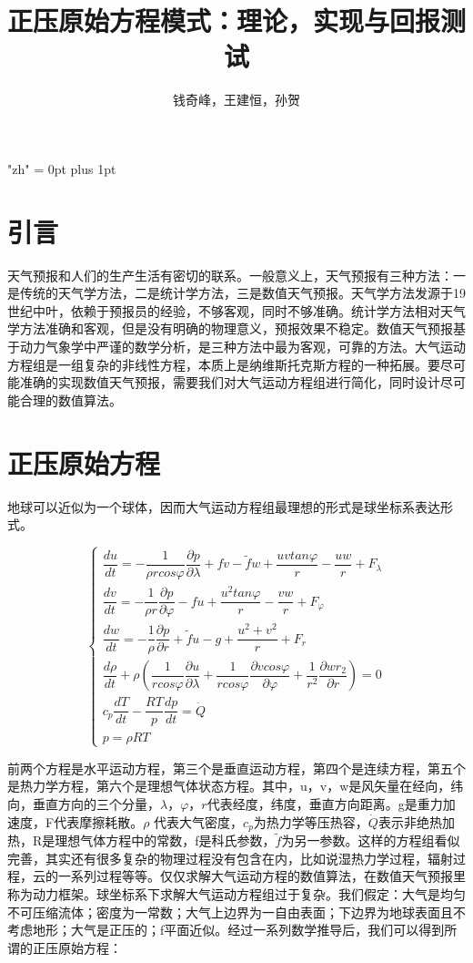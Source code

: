 \documentclass[a4paper,12pt]{article}
\title{正压原始方程模式：理论，实现与回报测试}
\date{}
\author{钱奇峰，王建恒，孙贺}
\begin{document}
\maketitle
\XeTeXlinebreaklocale "zh"
\XeTeXlinebreakskip = 0pt plus 1pt

\section{引言}
\indent
天气预报和人们的生产生活有密切的联系。一般意义上，天气预报有三种方法：一是传统的天气学方法，二是统计学方法，三是数值天气预报。天气学方法发源于19世纪中叶，依赖于预报员的经验，不够客观，同时不够准确。统计学方法相对天气学方法准确和客观，但是没有明确的物理意义，预报效果不稳定。数值天气预报基于动力气象学中严谨的数学分析，是三种方法中最为客观，可靠的方法。大气运动方程组是一组复杂的非线性方程，本质上是纳维斯托克斯方程的一种拓展。要尽可能准确的实现数值天气预报，需要我们对大气运动方程组进行简化，同时设计尽可能合理的数值算法。

\section{正压原始方程}
地球可以近似为一个球体，因而大气运动方程组最理想的形式是球坐标系表达形式。

\begin{equation}
\begin{cases}
\dfrac{du}{dt}=-\dfrac{1}{\rho r cos\varphi}\dfrac{\partial{p}}{\partial{\lambda}}+fv-\tilde{f}w+\dfrac{uvtan\varphi}{r}-\dfrac{uw}{r}+F_{\lambda}\\
\dfrac{dv}{dt}=-\dfrac{1}{\rho r }\dfrac{\partial{p}}{\partial{\varphi}}-fu+\dfrac{u^2tan\varphi}{r}-\dfrac{vw}{r}+F_{\varphi}\\
\dfrac{dw}{dt}=-\dfrac{1}{\rho}\dfrac{\partial{p}}{\partial{r}}+\tilde{f}u-g+\dfrac{u^2+v^2}{r}+F_r\\
\dfrac{d\rho}{dt}+\rho(\dfrac{1}{rcos\varphi}\dfrac{\partial{u}}{\partial{\lambda}} + \dfrac{1}{rcos\varphi}\dfrac{\partial{vcos\varphi}}{\partial{\varphi}} + \dfrac{1}{r^2}\dfrac{\partial{wr_2}}{\partial{r}})=0\\
c_p\dfrac{dT}{dt}-\dfrac{RT}{p}\dfrac{dp}{dt}=\dot{Q}\\
p=\rho RT
\end{cases}
\end{equation}

前两个方程是水平运动方程，第三个是垂直运动方程，第四个是连续方程，第五个是热力学方程，第六个是理想气体状态方程。其中，u，v，w是风矢量在经向，纬向，垂直方向的三个分量，$\lambda，\varphi，r$代表经度，纬度，垂直方向距离。g是重力加速度，F代表摩擦耗散。$\rho$ 代表大气密度，$c_p$为热力学等压热容，$\dot{Q}$表示非绝热加热，R是理想气体方程中的常数，f是科氏参数，$\tilde{f}$为另一参数。这样的方程组看似完善，其实还有很多复杂的物理过程没有包含在内，比如说湿热力学过程，辐射过程，云的一系列过程等等。仅仅求解大气运动方程的数值算法，在数值天气预报里称为动力框架。球坐标系下求解大气运动方程组过于复杂。我们假定：大气是均匀不可压缩流体；密度为一常数；大气上边界为一自由表面；下边界为地球表面且不考虑地形；大气是正压的；f平面近似。经过一系列数学推导后，我们可以得到所谓的正压原始方程：
\end{document}
